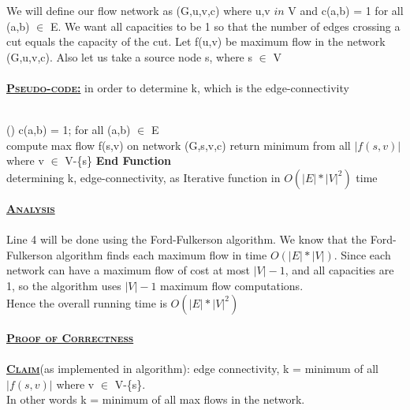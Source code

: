 \documentclass[a4 paper]{article}
\begin{document}
\newpage
{}
We will define our flow network as (G,u,v,c) where u,v $in$ V and c(a,b) = 1 for all (a,b) $\in$ E. We want all capacities to be 1 so that the number of edges crossing a cut equals the capacity of the cut. Let f(u,v) be maximum flow in the network (G,u,v,c). Also let us take a source node s, where s $\in$ V\\\\
\textbf{\underline{\textsc{Pseudo-code:}}} in order to determine k, which is the edge-connectivity\\\\
\begin{algorithm}[H]
\SetAlgoLined
{}
%
\Fn(){\FRecurs}
{
    c(a,b) = 1; for all (a,b) $\in$ E\\
    {
        compute max flow f(s,v) on network (G,s,v,c)\;
    }
    return minimum from all $|f(s,v)|$ where v $\in$ V-\{s\}
}
\textbf{End Function}\\
\caption{determining k, edge-connectivity, as Iterative function in $O(|E|*|V|^{2})$ time}
\end{algorithm}
\vspace{4mm}
\textbf{\underline{\textsc{Analysis}}}\\\\
Line 4 will be done using the Ford-Fulkerson algorithm. We know that the Ford-Fulkerson algorithm finds each maximum flow in time $O(|E|*|V|)$. Since each network can have a maximum flow of cost at most $|V| - 1$, and all capacities are 1, so the algorithm uses $|V| - 1$ maximum flow computations.\\ Hence the overall running time is $O(|E|*|V|^{2})$\\\\
\textbf{\underline{\textsc{Proof of Correctness}}}\\\\
\textbf{\underline{\textsc{Claim}}}(as implemented in algorithm): edge connectivity, k = minimum of all $|f(s,v)|$ where v $\in$ V-\{s\}. \\In other words k = minimum of all max flows in the network.\\\\
\end{document}
